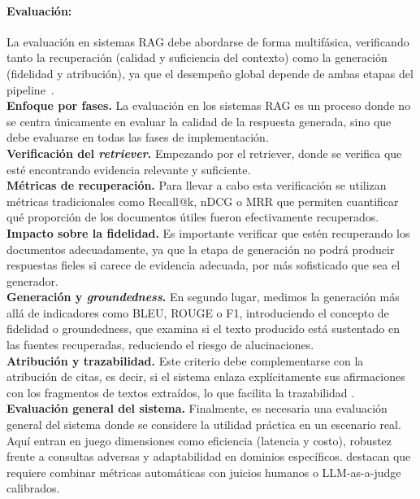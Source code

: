 \paragraph{Evaluación:} 
La evaluación en sistemas RAG debe abordarse de forma multifásica, verificando tanto la recuperación (calidad y suficiencia del contexto) como la generación
 (fidelidad y atribución), ya que el desempeño global depende de ambas etapas del pipeline~\textcite{knollmeyer2024benchmarking}.
\mbox{}\\
\noindent\textbf{Enfoque por fases.} La evaluación en los sistemas RAG es un proceso donde no se centra únicamente en evaluar la calidad de la respuesta generada, sino que debe evaluarse en todas las fases de implementación. 
\mbox{}\\
\noindent\textbf{Verificación del \textit{retriever}.} Empezando por el retriever, donde se verifica que esté encontrando evidencia relevante y suficiente. 
\mbox{}\\
\noindent\textbf{Métricas de recuperación.} Para llevar a cabo esta verificación se utilizan métricas tradicionales como Recall@k, nDCG o MRR que permiten cuantificar qué proporción de los documentos útiles fueron efectivamente recuperados. 
\mbox{}\\
\noindent\textbf{Impacto sobre la fidelidad.} Es importante verificar que estén recuperando los documentos adecuadamente, ya que la etapa de generación no podrá producir respuestas fieles si carece de evidencia adecuada, por más sofisticado que sea el generador.  
\mbox{}\\
\noindent\textbf{Generación y \textit{groundedness}.} En segundo lugar, medimos la generación más allá de indicadores como BLEU, ROUGE o F1, introduciendo el concepto de fidelidad o groundedness, que examina si el texto producido está sustentado en las fuentes recuperadas, reduciendo el riesgo de alucinaciones. 
\mbox{}\\
\noindent\textbf{Atribución y trazabilidad.} Este criterio debe complementarse con la atribución de citas, es decir, si el sistema enlaza explícitamente sus afirmaciones con los fragmentos de textos extraídos, lo que facilita la trazabilidad \parencite{zhang2025hallucination}.  
\mbox{}\\
\noindent\textbf{Evaluación general del sistema.} Finalmente, es necesaria una evaluación general del sistema donde se considere la utilidad práctica en un escenario real. Aquí entran en juego dimensiones como eficiencia (latencia y costo), robustez frente a consultas adversas y adaptabilidad en dominios específicos. \textcite{knollmeyer2024benchmarking} destacan que requiere combinar métricas automáticas con juicios humanos o LLM-as-a-judge calibrados.  
